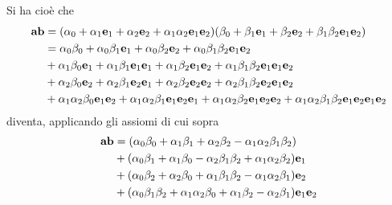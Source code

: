\begin{frame}
    Si ha cioè che 
    \[\begin{aligned}
        \mathbf{ab} &= 
            (\alpha_{0} + \alpha_{1}\mathbf{e}_{1} + \alpha_{2}\mathbf{e}_{2} 
                + \alpha_{1}\alpha_{2}\mathbf{e}_{1}\mathbf{e}_{2})
            (\beta_{0} + \beta_{1}\mathbf{e}_{1} + \beta_{2}\mathbf{e}_{2}
                + \beta_{1}\beta_{2}\mathbf{e}_{1}\mathbf{e}_{2}) \\
            &= \alpha_{0}\beta_{0} + \alpha_{0}\beta_{1}\mathbf{e}_{1}
            + \alpha_{0}\beta_{2}\mathbf{e}_{2} 
            + \alpha_{0}\beta_{1}\beta_{2}\mathbf{e}_{1}\mathbf{e}_{2} \\
            & + \alpha_{1}\beta_{0}\mathbf{e}_{1} + \alpha_{1}\beta_{1}\mathbf{e}_{1}\mathbf{e}_{1}
            + \alpha_{1}\beta_{2}\mathbf{e}_{1}\mathbf{e}_{2} 
            + \alpha_{1}\beta_{1}\beta_{2}\mathbf{e}_{1}\mathbf{e}_{1}\mathbf{e}_{2} \\
            & + \alpha_{2}\beta_{0}\mathbf{e}_{2} + \alpha_{2}\beta_{1}\mathbf{e}_{2}\mathbf{e}_{1}
            + \alpha_{2}\beta_{2}\mathbf{e}_{2}\mathbf{e}_{2} 
            + \alpha_{2}\beta_{1}\beta_{2}\mathbf{e}_{2}\mathbf{e}_{1}\mathbf{e}_{2} \\ 
            & + \alpha_{1}\alpha_{2}\beta_{0}\mathbf{e}_{1}\mathbf{e}_{2} 
            + \alpha_{1}\alpha_{2}\beta_{1}\mathbf{e}_{1}\mathbf{e}_{2}\mathbf{e}_{1}
            + \alpha_{1}\alpha_{2}\beta_{2}\mathbf{e}_{1}\mathbf{e}_{2}\mathbf{e}_{2}
            + \alpha_{1}\alpha_{2}\beta_{1}\beta_{2}\mathbf{e}_{1}\mathbf{e}_{2}\mathbf{e}_{1}\mathbf{e}_{2}
    \end{aligned}\]
    diventa, applicando gli assiomi di cui sopra
    \[\begin{aligned}
        \Vb{ab} & = (\alpha_{0}\beta_{0} + \alpha_{1}\beta_{1} 
        + \alpha_{2}\beta_{2} - \alpha_{1}\alpha_{2}\beta_{1}\beta_{2}) \\ 
        & + (\alpha_{0}\beta_{1} + \alpha_{1}\beta_{0} 
            - \alpha_{2}\beta_{1}\beta_{2} + \alpha_{1}\alpha_{2}\beta_{2})\Vb{e}_{1} \\
        & + (\alpha_{0}\beta_{2} + \alpha_{2}\beta_{0} 
            + \alpha_{1}\beta_{1}\beta_{2} - \alpha_{1}\alpha_{2}\beta_{1})\Vb{e}_{2} \\
        & + (\alpha_{0}\beta_{1}\beta_{2} + \alpha_{1}\alpha_{2}\beta_{0} 
            + \alpha_{1}\beta_{2} - \alpha_{2}\beta_{1})\Vb{e}_{1}\Vb{e}_{2}
    \end{aligned}

    \]
\end{frame}
